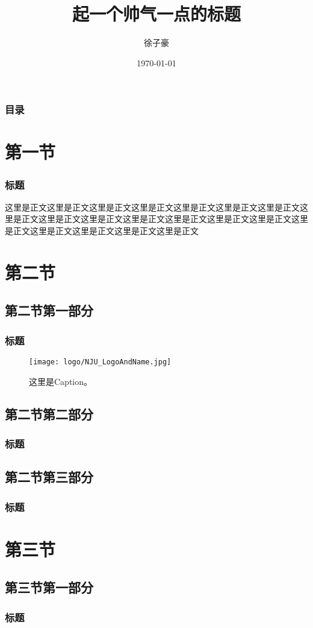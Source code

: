 \documentclass[xetex,mathserif,serif,handout]{beamer}
\begin{document}
	\title{起一个帅气一点的标题}
	\author{徐子豪}
	\date{\today}

	\frame{\titlepage}

	\begin{frame}
		\frametitle{目录}
		\makecontents
	\end{frame}

	\section{第一节}
	\begin{frame}
		\frametitle{标题}
		这里是正文这里是正文这里是正文这里是正文这里是正文这里是正文这里是正文这里是正文这里是正文这里是正文这里是正文这里是正文这里是正文这里是正文这里是正文这里是正文这里是正文这里是正文这里是正文\cite{XENON1T:SD}
	\end{frame}

	\section{第二节}
	\subsection{第二节第一部分}
	\begin{frame}
		\frametitle{标题}
		\begin{figure}
			\centering
			\texttt{[image: logo/NJU\_LogoAndName.jpg]}
			\caption{这里是Caption。}
		\end{figure}
	\end{frame}
	\subsection{第二节第二部分}
	\begin{frame}
		\frametitle{标题}
	\end{frame}
	\subsection{第二节第三部分}
	\begin{frame}
		\frametitle{标题}
	\end{frame}


	\section{第三节}
	\subsection{第三节第一部分}
	\begin{frame}
		\frametitle{标题}
	\end{frame}
\end{document}
